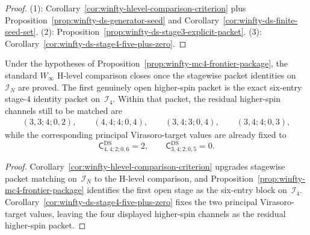 \begin{proof}
\textup{(1)}: Corollary~\ref{cor:winfty-hlevel-comparison-criterion} plus Proposition~\ref{prop:winfty-ds-generator-seed} and Corollary~\ref{cor:winfty-ds-finite-seed-set}.  \textup{(2)}: Proposition~\ref{prop:winfty-ds-stage3-explicit-packet}.  \textup{(3)}: Corollary~\ref{cor:winfty-ds-stage4-five-plus-zero}.
\end{proof}

\begin{corollary}
\label{cor:winfty-stage4-closure-criterion}
Under the hypotheses of
Proposition~\ref{prop:winfty-mc4-frontier-package}, the standard
\texorpdfstring{$W_\infty$}{W_infty} H-level comparison closes once the
stagewise packet identities on~$\mathcal{I}_N$ are proved.  The first
genuinely open higher-spin packet is the exact six-entry stage-$4$
identity packet on~$\mathcal{I}_4$.  Within that packet, the residual
higher-spin channels still to be matched are
\[
\begin{gathered}
(3,3;4;0,2),\qquad
(4,4;4;0,4),\qquad
(3,4;3;0,4),\qquad
(3,4;4;0,3),
\end{gathered}
\]
while the corresponding principal Virasoro-target values are already
fixed to
\[
\mathsf{C}^{\mathrm{DS}}_{4,4;2;0,6}=2,
\qquad
\mathsf{C}^{\mathrm{DS}}_{3,4;2;0,5}=0.
\]
\end{corollary}

\begin{proof}
Corollary~\ref{cor:winfty-hlevel-comparison-criterion} upgrades
stagewise packet matching on~$\mathcal{I}_N$ to the H-level
comparison, and
Proposition~\ref{prop:winfty-mc4-frontier-package} identifies the first
open stage as the six-entry block on~$\mathcal{I}_4$.
Corollary~\ref{cor:winfty-ds-stage4-five-plus-zero} fixes the two
principal Virasoro-target values, leaving the four displayed
higher-spin channels as the residual higher-spin packet.
\end{proof}

